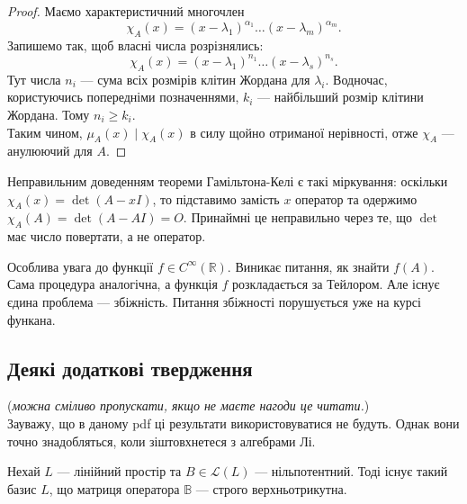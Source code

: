 \documentclass{math_library}
\begin{document}
\begin{proof}
Маємо характеристичний многочлен 
\[
\chi_A(x) = (x-\lambda_1)^{\alpha_1} \dots (x-\lambda_m)^{\alpha_m}.
\] Запишемо так, щоб власні числа розрізнялись:
\[
\chi_A(x) = (x-\lambda_1)^{n_1} \dots (x-\lambda_s)^{n_s}.
\]
Тут числа $n_i$ --- сума всіх розмірів клітин Жордана для $\lambda_i$. Водночас, користуючись попередніми позначеннями, $k_i$ --- найбільший розмір клітини Жордана. Тому $n_i \geq k_i$.\\
Таким чином, $\mu_A(x) \mid \chi_A(x)$ в силу щойно отриманої нерівності, отже $\chi_A$ --- анулюючий для $A$.
\end{proof}

\begin{remark}
Неправильним доведенням теореми Гамільтона-Келі є такі міркування: оскільки $\chi_A(x) = \det(A-xI)$, то підставимо замість $x$ оператор та одержимо $\chi_A(A) = \det(A-AI) = O$. Принаймні це неправильно через те, що $\det$ має число повертати, а не оператор.
\end{remark}

\noindent
Особлива увага до функції $f \in C^{\infty}(\mathbb{R})$. Виникає питання, як знайти $f(A)$. Сама процедура аналогічна, а функція $f$ розкладається за Тейлором. Але існує єдина проблема --- збіжність. Питання збіжності порушується уже на курсі функана.

\subsection{Деякі додаткові твердження}
(\textit{можна сміливо пропускати, якщо не маєте нагоди це читати.})\\
Зауважу, що в даному pdf ці результати використовуватися не будуть. Однак вони точно знадобляться, коли зіштовхнетеся з алгебрами Лі.

\begin{proposition}
Нехай $L$ --- лінійний простір та $B \in \mathcal{L}(L)$ --- нільпотентний. Тоді існує такий базис $L$, що матриця оператора $\mathbb{B}$ --- строго верхньотрикутна.
\end{proposition}
\end{document}
